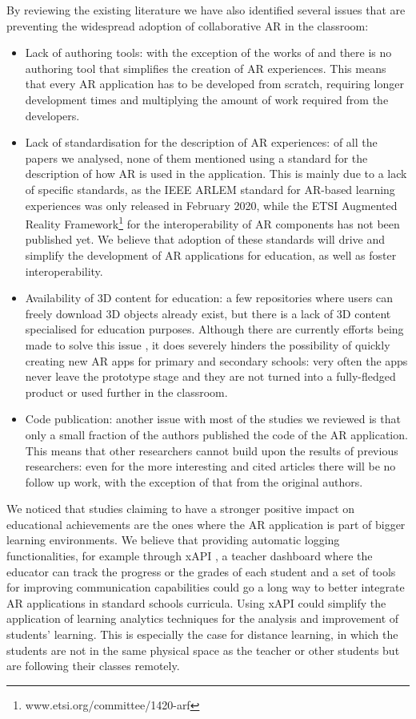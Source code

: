 By reviewing the existing literature we have also identified several issues that are preventing the widespread adoption of collaborative \gls{AR} in the classroom:
\begin{itemize}
    \item Lack of authoring tools: with the exception of the works of \citet{lytridis2018artutor} and \citet{whitlock2020mrcat} there is no authoring tool that simplifies the creation of AR experiences. This means that every AR application has to be developed from scratch, requiring longer development times and multiplying the amount of work required from the developers.
    \item Lack of standardisation for the description of AR experiences: of all the papers we analysed, none of them mentioned using a standard for the description of how AR is used in the application. This is mainly due to a lack of specific standards, as the IEEE ARLEM standard \citep{arlem2020} for AR-based learning experiences was only released in February 2020, while the ETSI Augmented Reality Framework\footnote{www.etsi.org/committee/1420-arf} for the interoperability of AR components has not been published yet. We believe that adoption of these standards will drive and simplify the development of \gls{AR} applications for education, as well as foster interoperability.
    \item Availability of 3D content for education: a few repositories where users can freely download 3D objects already exist, but there is a lack of 3D content specialised for education purposes. Although there are currently efforts being made to solve this issue \citep{masneri2020work}, it does severely hinders the possibility of quickly creating new AR apps for primary and secondary schools: very often the apps never leave the prototype stage and they are not turned into a fully-fledged product or used further in the classroom.
    \item Code publication: another issue with most of the studies we reviewed is that only a small fraction of the authors published the code of the \gls{AR} application. This means that other researchers cannot build upon the results of previous researchers: even for the more interesting and cited articles there will be no follow up work, with the exception of that from the original authors.
\end{itemize}

We noticed that studies claiming to have a stronger positive impact on educational achievements are the ones where the \gls{AR} application is part of bigger learning environments. We believe that providing automatic logging functionalities, for example through xAPI \citep{kevan2016experience}, a teacher dashboard where the educator can track the progress or the grades of each student and a set of tools for improving communication capabilities could go a long way to better integrate \gls{AR} applications in standard schools curricula. Using xAPI could simplify the application of learning analytics techniques for the analysis and improvement of students' learning. This is especially the case for distance learning, in which the students are not in the same physical space as the teacher or other students but are following their classes remotely.

